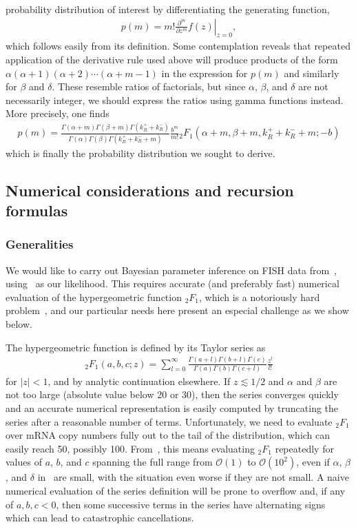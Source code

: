 probability distribution of interest by differentiating the generating function,
\begin{align}
p(m) = m! \left.\frac{\partial^m}{\partial z^m} f(z) \right|_{z=0},
\end{align}
which follows easily from its definition. Some contemplation reveals that
repeated application of the derivative rule used above will produce products of
the form $\alpha(\alpha+1)(\alpha+2)\cdots(\alpha+m-1)$ in the expression for
$p(m)$ and similarly for $\beta$ and $\delta$. These resemble ratios of
factorials, but since $\alpha$, $\beta$, and $\delta$ are not necessarily
integer, we should express the ratios using gamma functions instead. More
precisely, one finds
\begin{align}
p(m) = \frac{
        \Gamma(\alpha + m)\Gamma(\beta + m)\Gamma(k_R^+ + k_R^-)
        }
        {
        \Gamma(\alpha)\Gamma(\beta)\Gamma(k_R^+ + k_R^- + m)
        }
\frac{b^m}{m!}{_2F_1}(\alpha+m, \beta+m, k_R^++k_R^-+m; -b)
\label{eq:p_m_bursty+rep_appdx}
\end{align}
which is finally the probability distribution we sought to derive.

\subsection{Numerical considerations and recursion formulas}
\subsubsection{Generalities}
We would like to carry out Bayesian parameter inference on FISH data
from~\cite{Jones2014}, using~ as our
likelihood. This requires accurate (and preferably fast)
numerical evaluation of the hypergeometric function ${_2F_1}$,
which is a notoriously hard problem~\cite{Pearson2017, Gil2007},
and our particular needs here present an especial challenge as we show below.

The hypergeometric function is defined by its Taylor series as
\begin{align}
{_2F_1}(a,b,c;z) 
= \sum_{l=0}^\infty
\frac{\Gamma(a + l)\Gamma(b + l)\Gamma(c)}
        {\Gamma(a)\Gamma(b)\Gamma(c + l)}
\frac{z^l}{l!}
\end{align}
for $|z|<1$, and by analytic continuation elsewhere.
If $z\lesssim1/2$ and $\alpha$ and $\beta$ are not too large
(absolute value below 20 or 30),
then the series converges quickly and an accurate numerical representation is
easily computed by truncating the series after a reasonable number of terms.
Unfortunately, we need to evaluate ${_2F_1}$ over mRNA copy numbers fully out
to the tail of the distribution, which can easily reach 50, possibly 100.
From~, this means evaluating ${_2F_1}$
repeatedly for values of $a$, $b$, and $c$ spanning the full range
from $\mathcal{O}(1)$ to $\mathcal{O}(10^2)$,
even if $\alpha$, $\beta$, and $\delta$
in~ are small,
with the situation even worse if they are not small.
A naive numerical evaluation of the series definition will be
prone to overflow and, if any of $a,b,c<0$, then some successive terms in the
series have alternating signs which can lead to catastrophic cancellations.


